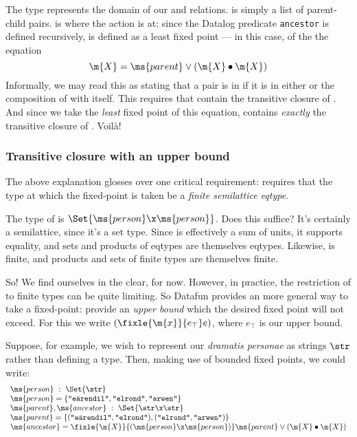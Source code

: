 The type  represents the domain of our  and 
relations.  is simply a list of parent-child pairs.  is
where the action is at: since the Datalog predicate \texttt{ancestor} is defined
recursively,  is defined as a least fixed point --- in this case,
of the the equation
\begin{equation*}
  \m{X} = \ms{parent} \vee (\m{X} \bullet \m{X})
\end{equation*}
Informally, we may read this as stating that a pair is in  if it is in
either  or the composition of  with itself. This requires that
 contain the transitive closure of . And since we take the
\emph{least} fixed point of this equation,  contains \emph{exactly}
the transitive closure of . Voil\`a!


\subsubsection{Transitive closure with an upper bound}

The above explanation glosses over one critical requirement:  requires
that the type at which the fixed-point is taken be a \emph{finite semilattice
  eqtype}.

The type of  is $\Set{\ms{person} \x \ms{person}}$. Does this
suffice? It's certainly a semilattice, since it's a set type. Since 
is effectively a sum of units, it supports equality, and sets and products of
eqtypes are themselves eqtypes. Likewise,  is finite, and products
and sets of finite types are themselves finite.

So! We find ourselves in the clear, for now. However, in practice, the
restriction of  to finite types can be quite limiting. So Datafun
provides an more general way to take a fixed-point: provide an \emph{upper
  bound} which the desired fixed point will not exceed. For this we write
$(\fixle{\m{x}}{e_\top} e)$, where $e_\top$ is our upper bound.

Suppose, for example, we wish to represent our \textit{dramatis personae} as
strings $\str$ rather than defining a  type. Then, making use of
bounded fixed points, we could write:
\[\begin{array}{l}
\ms{person} ~:~ \Set{\str}\\
\ms{person} = \{\texttt{"e\"arendil"}, \texttt{"elrond"}, \texttt{"arwen"}\}\\
\ms{parent}, \ms{ancestor} ~:~ \Set{\str \x \str}\\
\ms{parent} = \{(\texttt{"e\"arendil"}, \texttt{"elrond"}),
(\texttt{"elrond"}, \texttt{"arwen"})\}\\
\ms{ancestor} = \fixle{\m{X}}{(\ms{person} \x \ms{person})}
\ms{parent} \vee (\m{X} \bullet \m{X})
\end{array}\]

